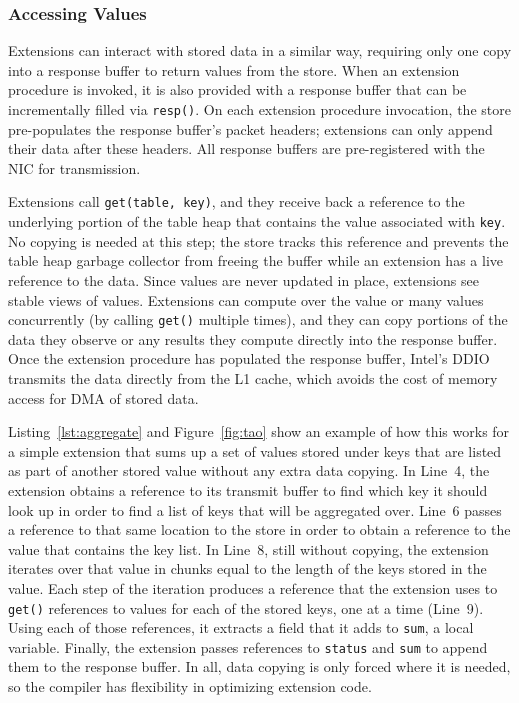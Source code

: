 \subsubsection{Accessing Values}
\label{sec:access}

Extensions can interact with stored data in a similar way, requiring only one
  copy into a response buffer to return values from the store.
When an extension procedure is invoked, it is also provided with a response
  buffer that can be incrementally filled via \texttt{resp()}.
On each extension procedure invocation, the store pre-populates the response
  buffer's packet headers; extensions can only append their data after these
  headers.
All response buffers are pre-registered with the NIC for transmission.

Extensions call \texttt{get(table, key)}, and they receive back a reference to
  the underlying portion of the table heap that contains the value associated
  with \texttt{key}.
No copying is needed at this step; the store tracks this reference and prevents the table
  heap garbage collector from freeing the buffer while an extension has a live
  reference to the data.
Since values are never updated in place, extensions see stable views of values.
Extensions can compute over the value or many values concurrently (by calling \texttt{get()} multiple times), and they can
  copy portions of the data they observe or any results they compute directly into
  the response buffer.
Once the extension procedure has populated the response buffer, Intel's
  DDIO~\cite{ddio} transmits the data directly from the L1 cache, which avoids
  the cost of memory access for DMA of stored data.

Listing~\ref{lst:aggregate} and Figure~\ref{fig:tao} show an example of how
  this works for a simple extension that sums up a set of values stored under
  keys that are listed as part of another stored value without any extra data copying.
In Line~4, the extension obtains a reference to its transmit buffer to find
  which key it should look up in order to find a list of keys that will be aggregated over.
Line~6 passes a reference to that same location to the store in order to
  obtain a reference to the value that contains the key list.
In Line~8, still without copying, the extension iterates over that value in
  chunks equal to the length of the keys stored in the value.
Each step of the iteration produces a reference that the extension uses
to \texttt{get()}
  references to values for each of the stored keys, one at a time (Line~9).
Using each of those references, it extracts a field that it adds to
  \texttt{sum}, a local variable.
Finally, the extension passes references to \texttt{status} and \texttt{sum} to append
  them to the response buffer.
In all, data copying is only forced where it is needed, so the compiler has
  flexibility in optimizing extension code.

